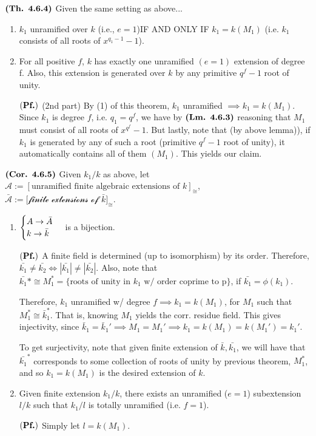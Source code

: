 \documentclass{article}
\begin{document}
$\textbf{(Th. 4.6.4)}$ 
Given the same setting as above...
\begin{enumerate} 
    \item $k_1$ unramified over $k$ (i.e., $e = 1$)IF AND ONLY IF $k_1 = k(M_1)$ (i.e. $k_1$ consists of all roots of $x^{q_1 - 1} - 1$).
    \item For all positive $f$, $k$ has exactly one unramified $(e=1)$ extension of degree f. Also, this extension is generated over $k$ by any primitive $q^f-1$ root of unity.
    
    $(\textbf{Pf.})$ (2nd part) By (1) of this theorem, $k_1 $ unramified $\implies k_1 = k(M_1)$. Since $k_1$ is degree $f$, i.e. $q_1 = q^f$, we have by $\textbf{(Lm. 4.6.3)}$ reasoning that $M_1$ must consist of all roots of $x^{q^f}-1$. But lastly, note that (by above lemma)), if $k_1$ is generated by any of such a root (primitive $q^f-1$ root of unity), it automatically contains all of them $(M_1)$. This yields our claim.
\end{enumerate}

$\textbf{(Cor. 4.6.5)}$ Given $k_1/k$ as above, let $\mathcal{A} := [\text{unramified finite algebraic extensions of }k]_{\cong}$, $\mathcal{\bar{A} := [\text{finite extensions of }} \bar{k}]_{\cong}$. 

\begin{enumerate}
    \item $\begin{cases}
        A \rightarrow \bar{A} \\
        k \rightarrow \bar{k}
    \end{cases}$ is a bijection.

    $(\textbf{Pf.})$ A finite field is determined (up to isomorphism) by its order. Therefore, $\bar{k_1} \ne \bar{k_2} \iff |\bar{k_1}| \ne |\bar{k_2}|$. Also, note that $\bar{k_1}* \cong M_1^* = \{ \text{roots of unity in } k_1 \text{ w/ order coprime to p}\}$, if $\bar{k_1} = \phi(k_1)$.

    Therefore, $k_1$ unramified w/ degree $f \implies k_1 = k(M_1)$, for $M_1$ such that $M_1^* \cong \bar{k}_1^*$. That is, knowing $M_1$ yields the corr. residue field. This gives injectivity, since $\bar{k}_1 = \bar{k}_1' \implies M_1 = M_1' \implies k_1 = k(M_1) = k(M_1') = k_1'$.

    To get surjectivity, note that given finite extension of $\bar{k}, \bar{k_1}$, we will have that $\bar{k_1}^*$ corresponds to some collection of roots of unity by previous theorem, $M_1^*$, and so $k_1 = k(M_1)$ is the desired extension of $k$.
    
    \item Given finite extension $k_1/k$, there exists an unramified ($e = 1$) subextension $l/k$ such that $k_1/l$ is totally unramified (i.e. $f = 1$).

    $(\textbf{Pf.})$ Simply let $l = k(M_1)$.
\end{enumerate}
\end{document}
